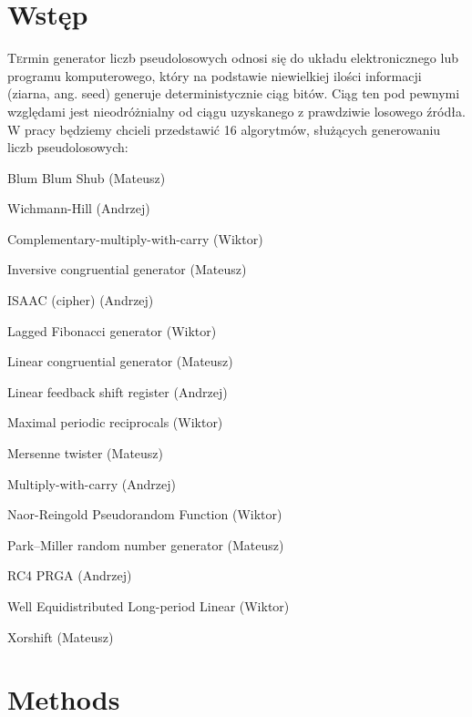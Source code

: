 \documentclass[twoside]{article}
\begin{document}
\begin{multicols}{2} %

\section{Wstęp}

\lettrine[nindent=0em,lines=3]{T}ermin generator liczb pseudolosowych odnosi się do układu elektronicznego lub programu komputerowego, który na podstawie niewielkiej ilości informacji (ziarna, ang. seed) generuje deterministycznie ciąg bitów. Ciąg ten pod pewnymi względami jest nieodróżnialny od ciągu uzyskanego z prawdziwie losowego źródła. W pracy będziemy chcieli przedstawić 16 algorytmów, służących generowaniu liczb pseudolosowych:
\begin{compactitem}
\item Blum Blum Shub (Mateusz)
\item Wichmann-Hill (Andrzej)
\item Complementary-multiply-with-carry (Wiktor)
\item Inversive congruential generator (Mateusz)
\item ISAAC (cipher) (Andrzej)
\item Lagged Fibonacci generator (Wiktor)
\item Linear congruential generator (Mateusz)
\item Linear feedback shift register (Andrzej)
\item Maximal periodic reciprocals (Wiktor)
\item Mersenne twister (Mateusz)
\item Multiply-with-carry (Andrzej)
\item Naor-Reingold Pseudorandom Function (Wiktor)
\item Park–Miller random number generator (Mateusz)
\item RC4 PRGA (Andrzej)
\item Well Equidistributed Long-period Linear (Wiktor)
\item Xorshift (Mateusz)
\end{compactitem}



\section{Methods}


\end{multicols}
\end{document}
